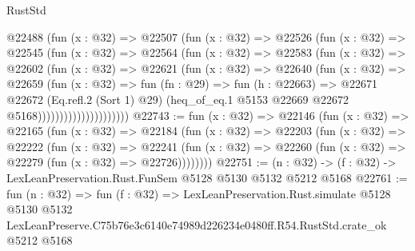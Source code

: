 \begin{lexlean}{RustStd}
\begin{coremodule}
                      @22488
                        (fun (x : @32) =>
                        @22507
                          (fun (x : @32) =>
                          @22526
                            (fun (x : @32) =>
                            @22545
                              (fun (x : @32) =>
                              @22564
                                (fun (x : @32) =>
                                @22583
                                  (fun (x : @32) =>
                                  @22602
                                    (fun (x : @32) =>
                                    @22621
                                      (fun (x : @32) =>
                                      @22640
                                        (fun (x : @32) =>
                                        @22659
                                          (fun (x : @32) =>
                                          fun (fn : @29) =>
                                          fun (h : @22663) =>
                                          @22671
                                            @22672
                                            (Eq.refl.{2} (Sort 1) @29)
                                            (heq_of_eq.{1}
                                              @5153
                                              @22669
                                              @22672
                                              @5168)))))))))))))))))))))
@22743 := fun (x : @32) =>
  @22146
    (fun (x : @32) =>
    @22165
      (fun (x : @32) =>
      @22184
        (fun (x : @32) =>
        @22203
          (fun (x : @32) =>
          @22222
            (fun (x : @32) =>
            @22241
              (fun (x : @32) => @22260 (fun (x : @32) => @22279 (fun (x : @32) => @22726))))))))
@22751 := (n : @32) -> (f : @32) -> LexLeanPreservation.Rust.FunSem @5128 @5130 @5132 @5212 @5168
@22761 := fun (n : @32) =>
  fun (f : @32) =>
  LexLeanPreservation.Rust.simulate
    @5128
    @5130
    @5132
    LexLeanPreserve.C75b76e3c6140e74989d226234e0480ff.R54.RustStd.crate_ok
    @5212
    @5168
\end{coremodule}
\end{lexlean}
